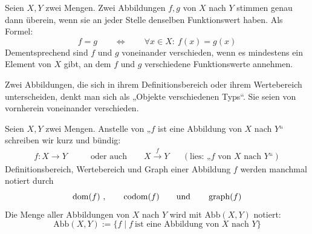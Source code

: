 \begin{axiom} \label{abbgleich}
    Seien $X,Y$ zwei Mengen. Zwei Abbildungen $f,g$ von $X$ nach $Y$ stimmen genau dann überein, wenn sie an jeder Stelle denselben Funktionswert haben. Als Formel:
        \[ f=g \qquad\Leftrightarrow\qquad \forall x\in X:\ f(x)=g(x) \]
    Dementsprechend sind $f$ und $g$ voneinander verschieden, wenn es mindestens ein Element von $X$ gibt, an dem $f$ und $g$ verschiedene Funktionswerte annehmen.
    
    Zwei Abbildungen, die sich in ihrem Definitionsbereich oder ihrem Wertebereich unterscheiden, denkt man sich als „Objekte verschiedenen Typs“. Sie seien von vornherein voneinander verschieden.
\end{axiom}


\begin{nota}
    Seien $X,Y$ zwei Mengen.
    Anstelle von „$f$ ist eine Abbildung von $X$ nach $Y$“ schreiben wir kurz und bündig:
    \begin{align*}
        f:X \to Y \qquad & \text{oder auch}\qquad X\xrightarrow{f} Y && (\text{lies: „$f$ von $X$ nach $Y$“})
    \end{align*}
    Definitionsbereich, Wertebereich und Graph einer Abbildung $f$ werden manchmal notiert durch
        \[ \operatorname{dom}(f)\ , \qquad \operatorname{codom}(f) \qquad\text{und}\qquad \operatorname{graph}(f)\]
    Die Menge aller Abbildungen von $X$ nach $Y$ wird mit $\text{Abb}(X,Y)$ notiert:
        \[ \text{Abb}(X,Y) := \{ f \mid f\ \text{ist eine Abbildung von $X$ nach $Y$} \} \]
\end{nota}


